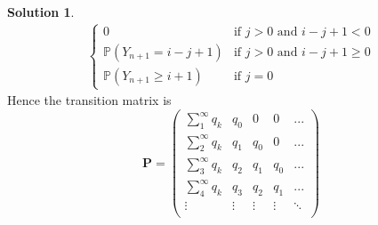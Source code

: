 \documentclass[a4paper, 10pt]{article}
\theoremstyle{definition}
\theoremstyle{hSol}
\newtheorem*{solution}{Solution}
\begin{document}
\begin{solution}
\begin{equation}
\begin{split}
\begin{cases}
    0 & \text{if } j>0 \text{ and } i-j+1 < 0\\
    \mathbb{P}\left(Y_{n+1}=i-j+1\right) & \text{if } j>0 \text{ and } i-j+1\geq 0\\
    \mathbb{P}\left(Y_{n+1}\geq i+1\right) & \text{if } j=0
  \end{cases}
  \end{split}
\end{equation}
Hence the transition matrix is
\begin{equation}
  \bm{P} = \begin{pmatrix}
    \sum_{1}^{\infty}q_k & q_0 & 0 & 0 & ...  \\
    \sum_{2}^{\infty}q_k & q_1 & q_0 & 0 & ...  \\
    \sum_{3}^{\infty}q_k & q_2 & q_1 & q_0 & ...  \\
    \sum_{4}^{\infty}q_k & q_3 & q_2 & q_1 & ...  \\
    \vdots & \vdots & \vdots & \vdots & \ddots  \\
  \end{pmatrix}
\end{equation}
\end{solution}
\end{document}
